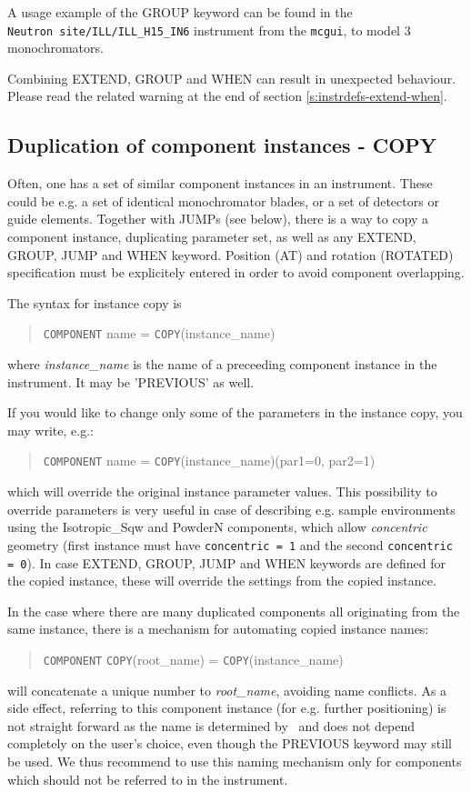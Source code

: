 A usage example of the GROUP keyword can be found in the \\
\verb+Neutron site/ILL/ILL_H15_IN6+ instrument from the \verb+mcgui+, to model 3 monochromators.

Combining EXTEND, GROUP and WHEN can result in unexpected behaviour. Please read the related warning at the end of section \ref{s:instrdefs-extend-when}.

\subsection{Duplication of component instances - COPY}
\label{s:instrdefs-extend-copy}

Often, one has a set of similar component instances in an instrument. These
could be e.g. a set of identical monochromator blades, or a set of detectors or
guide elements.  Together with JUMPs (see below), there is a way to copy a
component instance, duplicating parameter set, as well as any EXTEND, GROUP,
JUMP and WHEN keyword.  Position (AT) and rotation (ROTATED) specification must
be explicitely entered in order to avoid component overlapping.

The syntax for instance copy is
\begin{quote}
  \texttt{COMPONENT} name = \texttt{COPY}(instance\_name)
\end{quote}
where {\it instance\_name} is the name of a preceeding component instance in the
instrument. It may be 'PREVIOUS' as well.

If you would like to change only some of the parameters in the instance copy, you may write, e.g.:
\begin{quote}
  \texttt{COMPONENT} name = \texttt{COPY}(instance\_name)(par1=0, par2=1)
\end{quote}
which will override the original instance parameter values. This possibility to
override parameters is very useful in case of describing e.g. sample environments
using the Isotropic\_Sqw and PowderN components, which allow \emph{concentric}
geometry (first instance must have \verb+concentric = 1+ and the second
\verb+concentric = 0+). In case EXTEND, GROUP, JUMP and WHEN keywords are
defined for the copied instance, these will override the settings from the
copied instance.


In the case where there are many duplicated components all originating from the
same instance, there is a mechanism for automating copied instance names:
\begin{quote}
  \texttt{COMPONENT} \texttt{COPY}(root\_name) = \texttt{COPY}(instance\_name)
\end{quote}
will concatenate a unique number to {\it root\_name}, avoiding name
conflicts. As a side effect, referring to this component instance (for
e.g. further positioning) is not straight forward as the name is determined by
\MCS\ and does not depend completely on the user's choice, even though the
PREVIOUS keyword may still be used. We thus recommend to use this naming
mechanism only for components which should not be referred to in the instrument.

